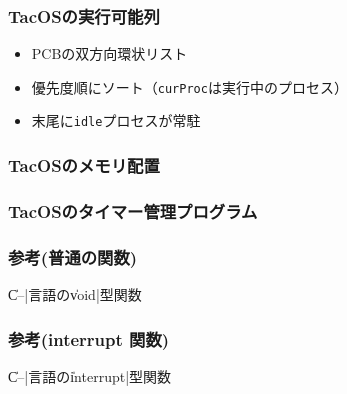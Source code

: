 \documentclass[unicode,handout]{beamer}                   %
\begin{document}
\begin{frame}
  \frametitle{TacOSの実行可能列}
  \begin{itemize}
    \item PCBの双方向環状リスト
    \item 優先度順にソート（\texttt{curProc}は実行中のプロセス）
    \item 末尾に\texttt{idle}プロセスが常駐 \\
      \vfill
  \end{itemize}
  \vfill
\end{frame}

\begin{frame}
  \frametitle{TacOSのメモリ配置}
\end{frame}

\begin{frame}
  \frametitle{TacOSのタイマー管理プログラム}
\end{frame}

\begin{frame}[fragile]
  \frametitle{参考(普通の関数)}
  \begin{minipage}{0.50\columnwidth}
    \|C--|言語の\|void|型関数
  \end{minipage}
  \hfill
  \begin{minipage}{0.38\columnwidth}
  \end{minipage}
\end{frame}

\begin{frame}[fragile]
  \frametitle{参考(interrupt 関数)}
  \begin{minipage}{0.50\columnwidth}
    \|C--|言語の\|interrupt|型関数
  \end{minipage}
  \hfill
  \begin{minipage}{0.38\columnwidth}
  \end{minipage}
\end{frame}
\end{document}
